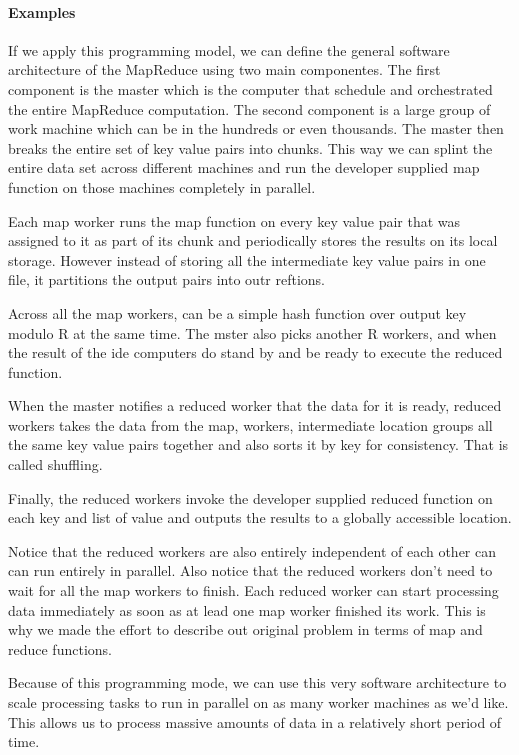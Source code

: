 \documentclass[a4paper, 11pt]{book}
\begin{document}
    \paragraph{Examples}

    If we apply this programming model, we can define the general software architecture of the MapReduce using two main componentes.
    The first component is the master which is the computer that schedule and orchestrated the entire MapReduce computation.
    The second component is a large group of work machine which can be in the hundreds or even thousands.
    The master then breaks the entire set of key value pairs into chunks.
    This way we can splint the entire data set across different machines and run the developer supplied map function on those machines completely in parallel.

    Each map worker runs the map function on every key value pair that was assigned to it as part of its chunk and periodically stores the results on its local storage.
    However instead of storing all the intermediate key value pairs in one file, it partitions the output pairs into outr reftions.

    Across all the map workers, can be a simple hash function over output key modulo R at the same time.
    The mster also picks another R workers, and when the result of the ide computers do stand by and be ready to execute the reduced function.

    When the master notifies a reduced worker that the data for it is ready, reduced workers takes the data from the map, workers, intermediate location groups all the same key value pairs together and also sorts it by key for consistency.
    That is called shuffling.

    Finally, the reduced workers invoke the developer supplied reduced function on each key and list of value and outputs the results to a globally accessible location.

    Notice that the reduced workers are also entirely independent of each other can can run entirely in parallel.
    Also notice that the reduced workers don't need to wait for all the map workers to finish.
    Each reduced worker can start processing data immediately as soon as at lead one map worker finished its work.
    This is why we made the effort to describe out original problem in terms of map and reduce functions.

    Because of this programming mode, we can use this very software architecture to scale processing tasks to run in parallel on as many worker machines as we'd like.
    This allows us to process massive amounts of data in a relatively short period of time.
\end{document}
